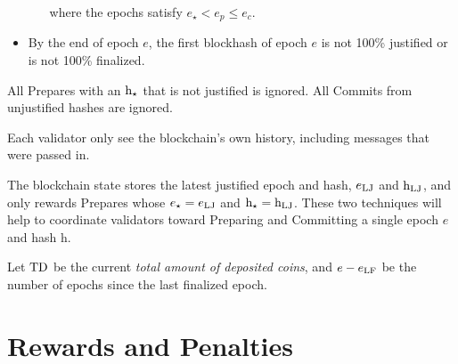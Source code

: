 \documentclass[12pt, final]{article}
\newcommand{\epoch}{\ensuremath{e}\xspace}
\newcommand{\hash}{\textnormal{h}\xspace}
\newcommand{\hashsource}{\ensuremath{\hash_{\star}}\xspace}
\newcommand{\epochsource}{\ensuremath{\epoch_{\star}}\xspace}
\newcommand{\totaldeposit}{\textnormal{TD}\xspace}
\newcommand{\epochLJ}{\ensuremath{\epoch_{\textnormal{LJ}}}\xspace}
\newcommand{\hashLJ}{\ensuremath{\hash_{\textnormal{LJ}}}\xspace} %
\newcommand{\epochLF}{\ensuremath{\epoch_{\textnormal{LF}}}\xspace}
\begin{document}
\begin{itemize}
\begin{enumerate}
where the epochs satisfy $\epochsource < \epoch_p \leq \epoch_c$.




     \end{enumerate}



\item By the end of epoch \epoch, the first blockhash of epoch \epoch is not 100\% justified or is not 100\% finalized.
\end{itemize}

All Prepares with an $\hashsource$ that is not justified is ignored.
All Commits from unjustified hashes are ignored.

Each validator only see the blockchain's own history, including messages that were passed in. 

The blockchain state stores the latest justified epoch and hash, $\epochLJ$ and $\hashLJ$, and only rewards Prepares whose $\epochsource = \epochLJ$ and $\hashsource = \hashLJ$. These two techniques will help to coordinate validators toward Preparing and Committing a single epoch \epoch and hash \hash.

Let $\totaldeposit$ be the current \emph{total amount of deposited coins}, and $\epoch - \epochLF$ be the number of epochs since the last finalized epoch.


\section{Rewards and Penalties}
\end{document}
